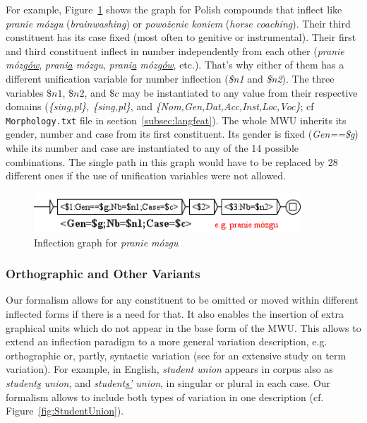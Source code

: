 \bigskip
\noindent For example, Figure~\ref{fig:PranieMozgu} shows the graph for Polish compounds that 
inflect like \emph{pranie m\'ozgu} (\emph{brainwashing}) or \emph{powo\.zenie koniem} 
(\emph{horse coaching}). Their third constituent has its case fixed (most often to genitive or 
instrumental). Their first and third constituent inflect in number independently from each other 
(\emph{pranie m\'ozg\underline{\'ow}}, \emph{prani\underline{a} m\'ozgu}, 
\emph{prani\underline{a} m\'ozg\underline{\'ow}}, etc.). That's why either of them has a different 
unification variable for number inflection (\emph{\$n1} and \emph{\$n2}). The three 
variables $\$n1$, $\$n2$, and $\$c$ may be instantiated to any value from their respective 
domains (\emph{\{sing,pl\}, \{sing,pl\}}, and \emph{\{Nom,Gen,Dat,Acc,Inst,Loc,Voc\}}; 
cf \verb+Morphology.txt+ file in section~\ref{subsec:langfeat}). The whole MWU
inherits its gender, number and case from its first constituent. Its gender is 
fixed (\emph{Gen==\$g}) while its number 
and case are instantiated to any of the 14 possible combinations. The single path in this graph 
would have to be replaced by 28 different ones if the use of unification variables were not allowed.

\begin{figure}[!htb]
  \centering
  \includegraphics[width=10cm]{resources/img/PranieMozgu.png}
  \caption{Inflection graph for \emph{pranie m\'ozgu}}
  \label{fig:PranieMozgu}
\end{figure}


\subsubsection{Orthographic and Other Variants}
Our formalism allows for any constituent to be omitted or moved within different inflected 
forms if there is a need for that. It also enables the insertion of extra graphical units 
which do not appear in the base form of the MWU. This allows to extend an inflection paradigm 
to a more general variation description, e.g. orthographic or, partly, syntactic variation 
(see \cite{Jacquemin01} for an extensive study on term variation). For example, in English, 
\emph{student union} appears in corpus also as \emph{student\underline{s} union}, and 
\emph{student\underline{s'} union}, in singular or plural in each case. Our formalism 
allows to include both types of variation in one description (cf. Figure~\ref{fig:StudentUnion}).

